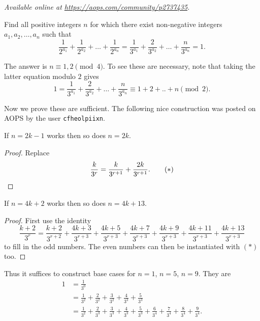 
\textsl{Available online at \url{https://aops.com/community/p2737435}.}
\begin{mdframed}[style=mdpurplebox,frametitle={Problem statement}]
Find all positive integers $n$
for which there exist non-negative integers $a_1, a_2, \dots, a_n$
such that
\[ \frac{1}{2^{a_1}} + \frac{1}{2^{a_2}} + \dots + \frac{1}{2^{a_n}}
  = \frac{1}{3^{a_1}} + \frac{2}{3^{a_2}} + \dots + \frac{n}{3^{a_n}}
  = 1. \]
\end{mdframed}
The answer is $n \equiv 1, 2 \pmod 4$.
To see these are necessary,
note that taking the latter equation modulo $2$ gives
\[ 1 = \frac{1}{3^{a_1}} + \frac{2}{3^{a_2}} + \dots + \frac{n}{3^{a_n}}
\equiv 1 + 2 + .. + n \pmod 2. \]

Now we prove these are sufficient.
The following nice construction was posted on AOPS
by the user \texttt{cfheolpiixn}.

\begin{claim*}
  If $n = 2k-1$ works then so does $n = 2k$.
\end{claim*}
\begin{proof}
  Replace
  \[ \frac{k}{3^r} = \frac{k}{3^{r+1}} + \frac{2k}{3^{r+1}}.
    \qquad(\ast) \qedhere \]
\end{proof}

\begin{claim*}
  If $n = 4k+2$ works then so does $n = 4k + 13$.
\end{claim*}
\begin{proof}
  First use the identity
  \[
    \frac{k+2}{3^r} = \frac{k+2}{3^{r+2}}
    + \frac{4k+ 3}{3^{r+3}}
    + \frac{4k+ 5}{3^{r+3}}
    + \frac{4k+ 7}{3^{r+3}}
    + \frac{4k+ 9}{3^{r+3}}
    + \frac{4k+11}{3^{r+3}}
    + \frac{4k+13}{3^{r+3}}
  \]
  to fill in the odd numbers.
  The even numbers can then be instantiated with $(\ast)$ too.
\end{proof}

Thus it suffices to construct base cases
for $n = 1$, $n = 5$, $n = 9$.
They are
\begin{align*}
  1 &= \frac{1}{3^0} \\
  &= \frac{1}{3^2} + \frac{2}{3^2} + \frac{3}{3^2}
    + \frac{4}{3^3} + \frac{5}{3^3} \\
  &= \frac{1}{3^2} + \frac{2}{3^3} + \frac{3}{3^3}
  + \frac{4}{3^3} + \frac{5}{3^3} + \frac{6}{3^4}
  + \frac{7}{3^4} + \frac{8}{3^4} + \frac{9}{3^4}.
\end{align*}
\pagebreak



